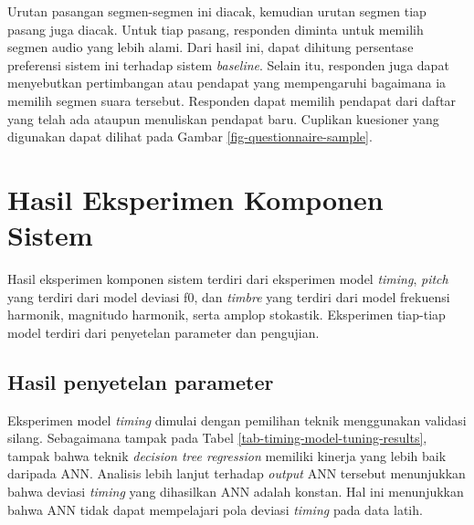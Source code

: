 Urutan pasangan segmen-segmen ini diacak, kemudian urutan segmen tiap pasang juga diacak. Untuk tiap pasang, responden diminta untuk memilih segmen audio yang lebih alami. Dari hasil ini, dapat dihitung persentase preferensi sistem ini terhadap sistem \textit{baseline}. Selain itu, responden juga dapat menyebutkan pertimbangan atau pendapat yang mempengaruhi bagaimana ia memilih segmen suara tersebut. Responden dapat memilih pendapat dari daftar yang telah ada ataupun menuliskan pendapat baru. Cuplikan kuesioner yang digunakan dapat dilihat pada Gambar \ref{fig-questionnaire-sample}. %

\section{Hasil Eksperimen Komponen Sistem}

Hasil eksperimen komponen sistem terdiri dari eksperimen model \textit{timing}, \textit{pitch} yang terdiri dari model deviasi f0, dan \textit{timbre} yang terdiri dari model frekuensi harmonik, magnitudo harmonik, serta amplop stokastik. Eksperimen tiap-tiap model terdiri dari penyetelan parameter dan pengujian.

\subsection{Hasil penyetelan parameter}

Eksperimen model \textit{timing} dimulai dengan pemilihan teknik menggunakan validasi silang. Sebagaimana tampak pada Tabel \ref{tab-timing-model-tuning-results}, tampak bahwa teknik \textit{decision tree regression} memiliki kinerja yang lebih baik daripada ANN. Analisis lebih lanjut terhadap \textit{output} ANN tersebut menunjukkan bahwa deviasi \textit{timing} yang dihasilkan ANN adalah konstan. Hal ini menunjukkan bahwa ANN tidak dapat mempelajari pola deviasi \textit{timing} pada data latih.

